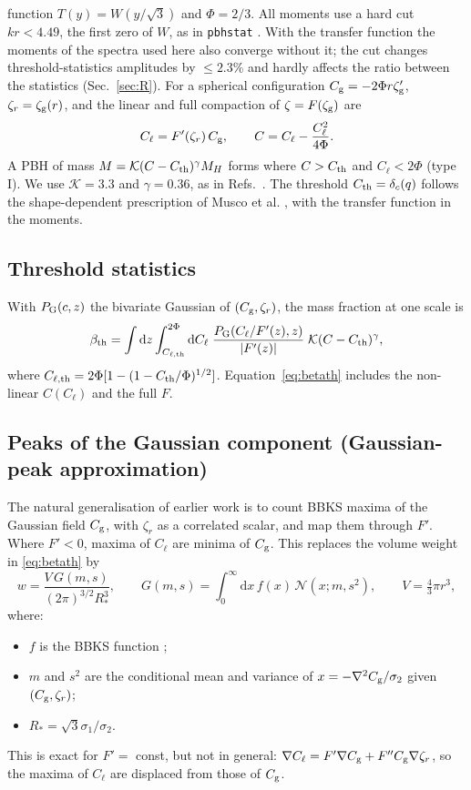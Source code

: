 \documentclass[11pt,a4paper]{article}
\newcommand{\Cg}{C_{\rm g}}
\newcommand{\Cl}{C_{\ell}}
\newcommand{\zr}{\zeta_r}
\newcommand{\zg}{\zeta_{\rm g}}
\newcommand{\dd}{\mathrm{d}}
\begin{document}
function $T(y)=W(y/\sqrt3)$ and $\Phi=2/3$. All moments use a hard cut $kr<4.49$, the first zero
of $W$, as in \texttt{pbhstat} \cite{ColeFumagalli}. With the transfer function the moments of the
spectra used here also converge without it; the cut changes threshold-statistics amplitudes by
$\le2.3\%$ and hardly affects the ratio between the statistics (Sec.~\ref{sec:R}). For
a spherical configuration $\Cg=-2\Phi r\zg'$, $\zr=\zg(r)$, and the linear and full compaction of
$\zeta=F(\zg)$ are \cite{Young19,DeLuca19,Ferrante,Young22}
\begin{equation}
\Cl=F'(\zr)\,\Cg,\qquad C=\Cl-\frac{\Cl^2}{4\Phi}.
\label{eq:Cl}
\end{equation}
A PBH of mass $M=\mathcal K(C-C_{\rm th})^\gamma M_H$ \cite{EC94,NJ98,MM13} forms where
$C>C_{\rm th}$ and $\Cl<2\Phi$ (type I). We use $\mathcal K=3.3$ and $\gamma=0.36$, as in
Refs.~\cite{Ferrante,Ianniccari}. The threshold $C_{\rm th}=\delta_c(q)$ follows the
shape-dependent prescription of Musco et al. \cite{Musco19,EGS20,Musco21}, with the transfer
function in the moments.

\subsection{Threshold statistics}
With $P_{\rm G}(c,z)$ the bivariate Gaussian of $(\Cg,\zr)$, the mass fraction at one scale is
\cite{Ferrante}
\begin{equation}
\beta_{\rm th}=\int\dd z\int_{C_{\ell,\rm th}}^{2\Phi}\dd\Cl\;\frac{P_{\rm G}(\Cl/F'(z),z)}{|F'(z)|}\;
\mathcal K(C-C_{\rm th})^\gamma ,
\label{eq:betath}
\end{equation}
where $C_{\ell,\rm th}=2\Phi[1-(1-C_{\rm th}/\Phi)^{1/2}]$. Equation~\eqref{eq:betath} includes the
non-linear $C(\Cl)$ and the full $F$.

\subsection{Peaks of the Gaussian component (Gaussian-peak approximation)}

The natural generalisation of earlier work is to count BBKS maxima of the Gaussian field $\Cg$,
with $\zr$ as a correlated scalar, and map them through $F'$. Where $F'<0$, maxima of $\Cl$ are
minima of $\Cg$. This replaces the volume weight in \eqref{eq:betath} by
\begin{equation}
w=\frac{V\,G(m,s)}{(2\pi)^{3/2}R_*^3},\qquad G(m,s)=\int_0^\infty\dd x\,f(x)\,\mathcal N(x;m,s^2),
\qquad V=\tfrac43\pi r^3,
\label{eq:3a}
\end{equation}
where:
\begin{itemize}
\item $f$ is the BBKS function \cite{BBKS};
\item $m$ and $s^2$ are the conditional mean and variance of $x=-\nabla^2\Cg/\sigma_{2}$ given
$(\Cg,\zr)$;
\item $R_*=\sqrt3\sigma_1/\sigma_2$.
\end{itemize}
This is exact for $F'=$ const, but not in general: $\nabla\Cl=F'\nabla\Cg+F''\Cg\nabla\zr$, so the
maxima of $\Cl$ are displaced from those of $\Cg$.
\end{document}
